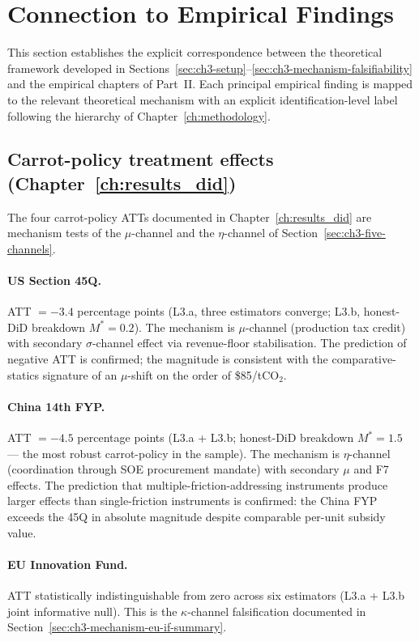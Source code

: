 \section{Connection to Empirical Findings}
\label{sec:ch3-empirical-connection}

This section establishes the explicit correspondence between the theoretical framework developed in Sections~\ref{sec:ch3-setup}--\ref{sec:ch3-mechanism-falsifiability} and the empirical chapters of Part~II. Each principal empirical finding is mapped to the relevant theoretical mechanism with an explicit identification-level label following the hierarchy of Chapter~\ref{ch:methodology}.

\subsection{Carrot-policy treatment effects (Chapter~\ref{ch:results_did})}
\label{sec:ch3-conn-carrot}

The four carrot-policy ATTs documented in Chapter~\ref{ch:results_did} are mechanism tests of the $\mu$-channel and the $\eta$-channel of Section~\ref{sec:ch3-five-channels}.

\paragraph{US Section 45Q.} ATT $= -3.4$ percentage points (L3.a, three estimators converge; L3.b, honest-DiD breakdown $M^* = 0.2$). The mechanism is $\mu$-channel (production tax credit) with secondary $\sigma$-channel effect via revenue-floor stabilisation. The prediction of negative ATT is confirmed; the magnitude is consistent with the comparative-statics signature of an $\mu$-shift on the order of \$85/tCO$_2$.

\paragraph{China 14th FYP.} ATT $= -4.5$ percentage points (L3.a + L3.b; honest-DiD breakdown $M^* = 1.5$ --- the most robust carrot-policy in the sample). The mechanism is $\eta$-channel (coordination through SOE procurement mandate) with secondary $\mu$ and F7 effects. The prediction that multiple-friction-addressing instruments produce larger effects than single-friction instruments is confirmed: the China FYP exceeds the 45Q in absolute magnitude despite comparable per-unit subsidy value.

\paragraph{EU Innovation Fund.} ATT statistically indistinguishable from zero across six estimators (L3.a + L3.b joint informative null). This is the $\kappa$-channel falsification documented in Section~\ref{sec:ch3-mechanism-eu-if-summary}.

